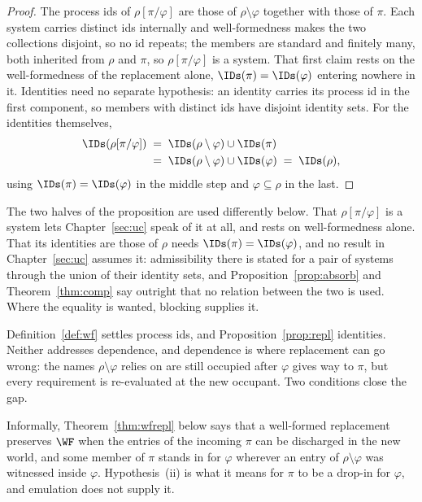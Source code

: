 \documentclass[10pt,oneside,openany]{book}
\theoremstyle{accentdef}
\theoremstyle{accentplain}
\begin{document}
\begin{proof}
The process ids of $\rho[\pi/\varphi]$ are those of $\rho \setminus \varphi$ together with those
of $\pi$. Each system carries distinct ids internally and well-formedness makes the two collections
disjoint, so no id repeats; the members are standard and finitely many, both inherited from $\rho$
and $\pi$, so $\rho[\pi/\varphi]$ is a system. That first claim rests on the well-formedness of the
replacement alone, $\IDs(\pi) = \IDs(\varphi)$ entering nowhere in it. Identities need no separate
hypothesis: an identity carries its process id in the first component, so members with distinct
ids have disjoint identity sets. For the identities themselves,
\[
  \begin{aligned}
  \IDs(\rho[\pi/\varphi]) &\;=\; \IDs(\rho \setminus \varphi) \cup \IDs(\pi) \\
  &\;=\; \IDs(\rho \setminus \varphi) \cup \IDs(\varphi) \;=\; \IDs(\rho),
  \end{aligned}
\]
using $\IDs(\pi) = \IDs(\varphi)$ in the middle step and $\varphi \subseteq \rho$ in the last.
\end{proof}

The two halves of the proposition are used differently below. That $\rho[\pi/\varphi]$ is a system
lets Chapter~\ref{sec:uc} speak of it at all, and rests on well-formedness alone. That its
identities are those of $\rho$ needs $\IDs(\pi) = \IDs(\varphi)$, and no result in
Chapter~\ref{sec:uc} assumes it: admissibility there is stated for a pair of systems through the
union of their identity sets, and Proposition~\ref{prop:absorb} and Theorem~\ref{thm:comp} say
outright that no relation between the two is used. Where the equality is wanted, blocking supplies
it.

Definition~\ref{def:wf} settles process ids, and Proposition~\ref{prop:repl} identities. Neither
addresses dependence, and dependence is where replacement can go wrong: the names
$\rho \setminus \varphi$ relies on are still occupied after $\varphi$ gives way to $\pi$, but
every requirement is re-evaluated at the new occupant. Two conditions close the gap.

Informally, Theorem~\ref{thm:wfrepl} below says that a well-formed replacement preserves $\WF$
when the entries of the incoming $\pi$ can be discharged in the new world, and some member of
$\pi$ stands in for $\varphi$ wherever an entry of $\rho \setminus \varphi$ was witnessed inside
$\varphi$. Hypothesis~(ii) is what it means for $\pi$ to be a drop-in for $\varphi$, and
emulation does not supply it.
\end{document}
